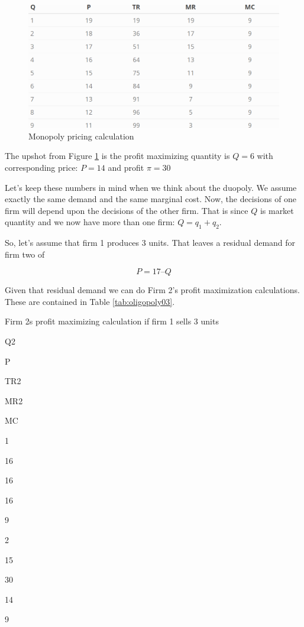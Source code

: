 \documentclass[
]{book}
\begin{document}
\begin{figure}

{\centering \includegraphics[width=0.8\linewidth]{img/oligopoly/gentable2} 

}

\caption{Monopoly pricing calculation}\label{fig:oligopoly2}
\end{figure}

The upshot from Figure \ref{fig:oligopoly2} is the profit maximizing quantity is \(Q = 6\) with corresponding price: \(P=14\) and profit \(\pi=30\)

Let's keep these numbers in mind when we think about the duopoly. We assume exactly the same demand and the same marginal cost. Now, the decisions of one firm will depend upon the decisions of the other firm. That is since \(Q\) is market quantity and we now have more than one firm: \(Q=q_1+q_2\).

So, let's assume that firm 1 produces 3 units. That leaves a residual demand for firm two of

\[P = 17 – Q\]

Given that residual demand we can do Firm 2's profit maximization calculations. These are contained in Table \ref{tab:oligopoly03}.

\label{tab:oligopoly03}Firm 2s profit maximizing calculation if firm 1 sells 3 units

Q2

P

TR2

MR2

MC

1

16

16

16

9

2

15

30

14

9
\end{document}
